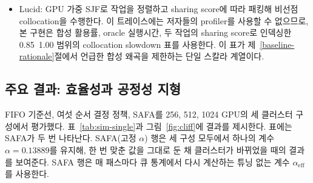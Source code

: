 \documentclass{ieeetj}
\begin{document}
\begin{itemize}
\item Lucid: GPU 가중 SJF로 작업을 정렬하고 sharing score에 따라 패킹해 비선점 collocation을 수행한다. 이 트레이스에는 저자들의 profiler를 사용할 수 없으므로, 본 구현은 합성 활용률, oracle 실행시간, 두 작업의 sharing score로 인덱싱한 0.85~1.00 범위의 collocation slowdown 표를 사용한다. 이 표가 제~\ref{baseline-rationale}절에서 언급한 합성 왜곡을 제한하는 단일 스칼라 계열이다.
\end{itemize}

\subsection{주요 결과: 효율성과 공정성 지형}\label{eval:main}
FIFO 기준선, 여섯 순서 결정 정책, SAFA를 256, 512, 1024 GPU의 세 클러스터 구성에서 평가했다. 표~\ref{tab:sim-single}과 그림~\ref{fig:cliff}에 결과를 제시한다. 표에는 SAFA가 두 번 나타난다. SAFA(고정 $\alpha$) 행은 세 구성 모두에서 하나의 계수 $\alpha=0.13889$를 유지해, 한 번 맞춘 값을 그대로 둔 채 클러스터가 바뀌었을 때의 결과를 보여준다. SAFA 행은 매 패스마다 큐 통계에서 다시 계산하는 튜닝 없는 계수 $\alpha_{\text{eff}}$를 사용한다.
\end{document}
